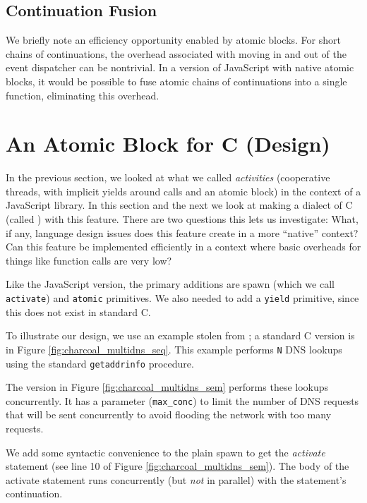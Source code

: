 \documentclass[acmsmall,anonymous,review]{acmart}\settopmatter{printfolios=true,printccs=false,printacmref=false}
\begin{document}
\subsection{Continuation Fusion}

We briefly note an efficiency opportunity enabled by atomic blocks.
For short chains of continuations, the overhead associated with moving in and out of the event dispatcher can be nontrivial.
In a version of JavaScript with native atomic blocks, it would be possible to fuse atomic chains of continuations into a single function, eliminating this overhead.


\section{An Atomic Block for C (Design)}

In the previous section, we looked at what we called \emph{activities} (cooperative threads, with implicit yields around calls and an atomic block) in the context of a JavaScript library.
In this section and the next we look at making a dialect of C (called \charcoal{}) with this feature.
There are two questions this lets us investigate:
What, if any, language design issues does this feature create in a more ``native'' context?
Can this feature be implemented efficiently in a context where basic overheads for things like function calls are very low?

Like the JavaScript version, the primary additions are spawn (which we call \texttt{activate}) and \texttt{atomic} primitives.
We also needed to add a \texttt{yield} primitive, since this does not exist in standard C.

To illustrate our design, we use an example stolen from \cite{Krohn2007}; a standard C version is in Figure \ref{fig:charcoal_multidns_seq}.
This example performs \texttt{N} DNS lookups using the standard \texttt{getaddrinfo} procedure.

The \charcoal{} version in Figure \ref{fig:charcoal_multidns_sem} performs these lookups concurrently.
It has a parameter (\texttt{max\_conc}) to limit the number of DNS requests that will be sent concurrently to avoid flooding the network with too many requests.

We add some syntactic convenience to the plain spawn to get the \emph{activate} statement (see line 10 of Figure \ref{fig:charcoal_multidns_sem}).
The body of the activate statement runs concurrently (but \emph{not} in parallel) with the statement's continuation.
\end{document}
